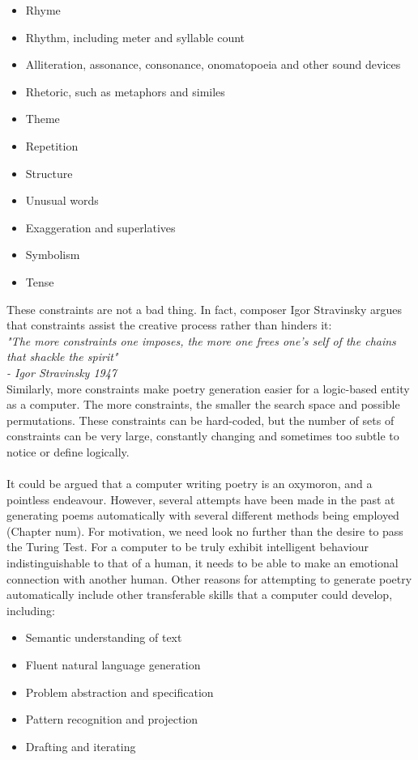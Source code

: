 \begin{itemize}
\item{Rhyme}
\item{Rhythm, including meter and syllable count}
\item{Alliteration, assonance, consonance, onomatopoeia and other sound devices}
\item{Rhetoric, such as metaphors and similes}
\item{Theme}
\item{Repetition}
\item{Structure}
\item{Unusual words}
\item{Exaggeration and superlatives}
\item{Symbolism}
\item{Tense}
\end{itemize}



These constraints are not a bad thing. In fact, composer Igor Stravinsky argues that constraints assist the creative process rather than hinders it:\\
\textit{"The more constraints one imposes, the more one frees one's self of the chains that shackle the spirit"\\ \hfill{- Igor Stravinsky 1947}}\\
Similarly, more constraints make poetry generation easier for a logic-based entity as a computer. The more constraints, the smaller the search space and possible permutations. These constraints can be hard-coded, but the number of sets of constraints can be very large, constantly changing and sometimes too subtle to notice or define logically.
\\\\
It could be argued that a computer writing poetry is an oxymoron, and a pointless endeavour. However, several attempts have been made in the past at generating poems automatically with several different methods being employed (Chapter num). For motivation, we need look no further than the desire to pass the Turing Test. For a computer to be truly exhibit intelligent behaviour indistinguishable to that of a human, it needs to be able to make an emotional connection with another human. Other reasons for attempting to generate poetry automatically include other transferable skills that a computer could develop, including:
\begin{itemize}
\item{Semantic understanding of text}
\item{Fluent natural language generation}
\item{Problem abstraction and specification}
\item{Pattern recognition and projection}
\item{Drafting and iterating}
\end{itemize}

